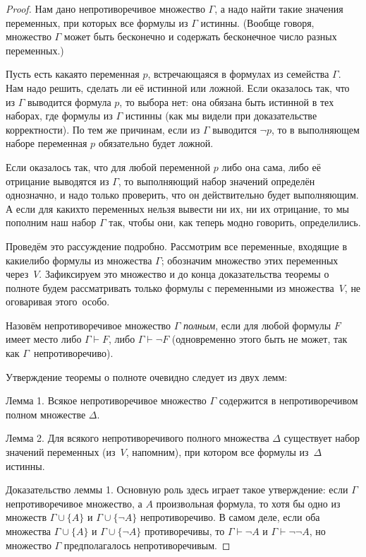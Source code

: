 \begin{proof}
Нам дано непротиворечивое множество $\Gamma$, а надо найти такие
значения переменных, при которых все формулы из $\Gamma$
истинны. (Вообще говоря, множество $\Gamma$ может быть
бесконечно и содержать бесконечное число разных переменных.)

Пусть есть какая\д то переменная $p$, встречающаяся
в формулах из семейства $\Gamma$. Нам надо решить, сделать ли
её истинной или ложной. Если оказалось так, что из
$\Gamma$ выводится формула $p$, то выбора нет: она обязана
быть истинной в тех наборах, где формулы из $\Gamma$ истинны
(как мы видели при доказательстве корректности). По тем же
причинам, если из $\Gamma$ выводится $\lnot p$, то в выполняющем
наборе переменная $p$ обязательно будет ложной.

Если оказалось так, что для любой переменной $p$ либо она сама,
либо её отрицание выводятся из $\Gamma$, то выполняющий набор
значений определён однозначно, и надо только проверить, что он
действительно будет выполняющим. А если для каких\д то
переменных нельзя вывести ни их, ни их отрицание, то мы пополним
наш набор $\Gamma$ так, чтобы они, как теперь модно говорить,
 определились.

Проведём это рассуждение подробно.
Рассмотрим все переменные, входящие в какие\д либо формулы из
множества $\Gamma$; обозначим множество этих переменных
через~$V$. Зафиксируем это множество и до конца доказательства
теоремы о полноте будем рассматривать только формулы с переменными
из множества~$V$, не оговаривая этого~особо.

Назовём непротиворечивое множество $\Gamma$ \emph{полным},%
%
если
для любой формулы $F$ имеет место либо $\Gamma\vdash F$, либо
$\Gamma\vdash \lnot F$ (одновременно этого быть не может, так
как $\Gamma$~непротиворечиво).

Утверждение теоремы о полноте очевидно следует из двух лемм:

        \label{completeness-second-proof-lemma-1}%
\textsf{Лемма 1.} Всякое непротиворечивое множество $\Gamma$
содержится в непротиворечивом полном множестве $\Delta$.

        \label{completeness-second-proof-lemma-2}%
\textsf{Лемма 2.} Для всякого непротиворечивого полного
множества $\Delta$ существует набор значений переменных
(из~$V$, напомним), при котором все формулы из~$\Delta$
истинны.

Доказательство леммы 1. Основную роль здесь играет такое
ут\-верж\-де\-ние: если $\Gamma$\т непротиворечивое множество, а $A$\т
произвольная формула, то хотя бы одно из множеств
$\Gamma\cup\{A\}$ и $\Gamma\cup\{\lnot A\}$ непротиворечиво. В
самом деле, если оба множества
$\Gamma\cup\{A\}$ и
$\Gamma\cup\{\lnot A\}$ противоречивы, то
$\Gamma\vdash\lnot A$ и $\Gamma\vdash\lnot\lnot A$,
но множество $\Gamma$
предполагалось непротиворечивым.


\end{proof}
